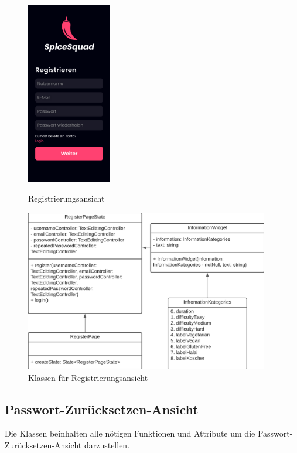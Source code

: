 \documentclass[parskip=full]{scrartcl}
\begin{document}
    \begin{figure}[htp]
        \begin{minipage}
            [t]{0.49\textwidth}
            \centering
            \includegraphics[height=80mm]{images/Presentation-layer/RegisterView.jpg}
            \caption{Registrierungsansicht}
        \end{minipage}
        \begin{minipage}
            [t]{0.49\textwidth}
            \centering
            \includegraphics[width=0.95\textwidth]{images/Presentation-layer/RegisterViewClass.png}
            \caption{Klassen für Registrierungsansicht}
        \end{minipage}
    \end{figure}    
        
    \newpage

\subsection{Passwort-Zurücksetzen-Ansicht}
    Die Klassen beinhalten alle nötigen Funktionen und Attribute um die Passwort-Zurücksetzen-Ansicht darzustellen.
    
\end{document}
